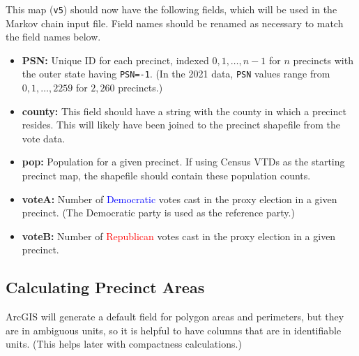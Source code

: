 \documentclass[11pt]{article}
\begin{document}
This map (\verb|v5|) should now have the following fields, which will be used in the Markov chain input file. Field names should be renamed as necessary to match the field names below.
\begin{itemize}
	\item \textbf{PSN:} Unique ID for each precinct, indexed $0,1,\dots,n-1$ for $n$ precincts with the outer state having \verb|PSN=-1|. (In the 2021 data, \verb|PSN| values range from $0,1,\dots , 2259$ for $2,260$ precincts.)
	\item \textbf{county:} This field should have a string with the county in which a precinct resides. This will likely have been joined to the precinct shapefile from the vote data.
	\item \textbf{pop:} Population for a given precinct. If using Census VTDs as the starting precinct map, the shapefile should contain these population counts.
	\item \textbf{voteA:} Number of \textcolor{blue}{Democratic} votes cast in the proxy election in a given precinct. (The Democratic party is used as the reference party.)
	\item \textbf{voteB:} Number of \textcolor{red}{Republican} votes cast in the proxy election in a given precinct. 
\end{itemize}

\subsection{Calculating Precinct Areas}

ArcGIS will generate a default field for polygon areas and perimeters, but they are in ambiguous units, so it is helpful to have columns that are in identifiable units. (This helps later with compactness calculations.)
\end{document}
